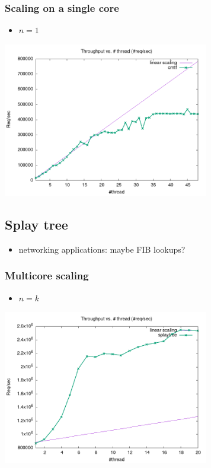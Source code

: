 \documentclass[11pt]{article}
\begin{document}
\subsubsection{Scaling on a single core}
\label{sec:orgd1770c1}
\begin{itemize}
\item \(n=1\)
\end{itemize}
\begin{center}
\includegraphics[width=9cm]{cmtf-cpu-bound-150.png}
\end{center}

\subsection{Splay tree}
\label{sec:org3e4aad2}
\begin{itemize}
\item networking applications: maybe FIB lookups?
\end{itemize}

\subsubsection{Multicore scaling}
\label{sec:orgd1eb1a1}
\begin{itemize}
\item \(n=k\)
\end{itemize}

\begin{center}
\includegraphics[width=9cm]{splay-no-cpu-bound.png}
\end{center}
\end{document}
